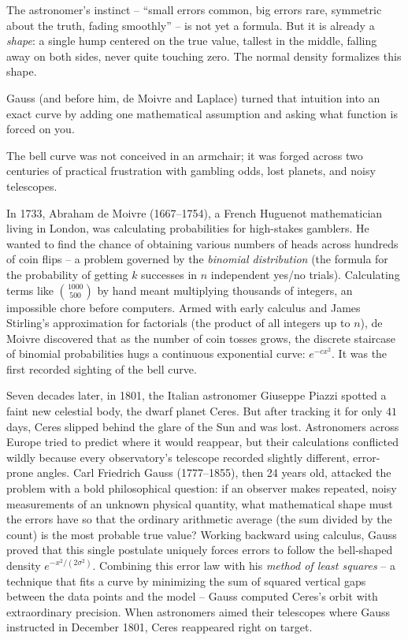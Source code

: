 \begin{intuitionbox}
The astronomer's instinct -- ``small errors common, big errors rare, symmetric
about the truth, fading smoothly'' -- is not yet a formula. But it is already a
\emph{shape}: a single hump centered on the true value, tallest in the middle,
falling away on both sides, never quite touching zero. The normal
density formalizes this shape.
\end{intuitionbox}

Gauss (and before him, de Moivre and Laplace) turned that intuition into an exact curve by adding one mathematical assumption and asking what function is forced on you.

\begin{historybox}
The bell curve was not conceived in an armchair; it was forged across two
centuries of practical frustration with gambling odds, lost planets, and noisy
telescopes.

In 1733, Abraham de Moivre (1667--1754), a French Huguenot mathematician living in
London, was calculating probabilities for high-stakes gamblers. He wanted to
find the chance of obtaining various numbers of heads across hundreds of coin
flips -- a problem governed by the \emph{binomial distribution} (the formula for
the probability of getting $k$ successes in $n$ independent yes/no trials).
Calculating terms like $\binom{1000}{500}$ by hand meant multiplying thousands of
integers, an impossible chore before computers. Armed with early calculus and
James Stirling's approximation for factorials (the product of all integers up to
$n$), de Moivre discovered that as the number of coin tosses grows, the discrete
staircase of binomial probabilities hugs a continuous exponential curve:
$e^{-c x^2}$. It was the first recorded sighting of the bell curve.

Seven decades later, in 1801, the Italian astronomer Giuseppe Piazzi spotted a
faint new celestial body, the dwarf planet Ceres. But after tracking it for only
$41$ days, Ceres slipped behind the glare of the Sun and was lost. Astronomers
across Europe tried to predict where it would reappear, but their calculations
conflicted wildly because every observatory's telescope recorded slightly
different, error-prone angles. Carl Friedrich Gauss (1777--1855), then 24 years
old, attacked the problem with a bold philosophical question: if an observer
makes repeated, noisy measurements of an unknown physical quantity, what
mathematical shape must the errors have so that the ordinary arithmetic average
(the sum divided by the count) is the most probable true value? Working backward
using calculus, Gauss proved that this single postulate uniquely forces errors to
follow the bell-shaped density $e^{-x^2/(2\sigma^2)}$. Combining this error law
with his \emph{method of least squares} -- a technique that fits a curve by
minimizing the sum of squared vertical gaps between the data points and the
model -- Gauss computed Ceres's orbit with extraordinary precision. When
astronomers aimed their telescopes where Gauss instructed in December 1801, Ceres
reappeared right on target.


\end{historybox}
